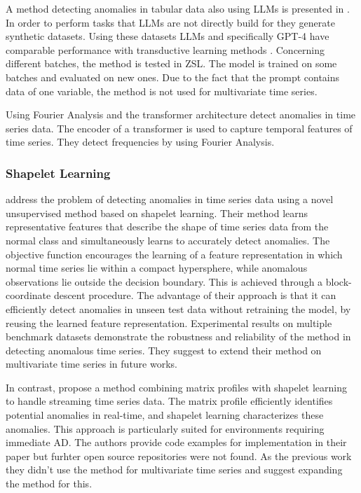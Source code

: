 A method detecting anomalies in tabular data also using LLMs is presented in \cite{li_anomaly_2024}. In order to perform tasks that LLMs are not directly build for they generate synthetic datasets. Using these datasets LLMs and specifically GPT-4 have comparable performance with transductive learning methods \cite[p. 6]{li_anomaly_2024}. Concerning different batches, the method is tested in ZSL. The model is trained on some batches and evaluated on new ones. Due to the fact that the prompt contains data of one variable, the method is not used for multivariate time series.

Using Fourier Analysis and the transformer architecture \cite{ye_multivariate_2023} detect anomalies in time series data. The encoder of a transformer is used to capture temporal features of time series. They detect frequencies by using Fourier Analysis.

\subsubsection{Shapelet Learning}
\cite{beggel_time_2019} address the problem of detecting anomalies in time series data using a novel unsupervised method based on shapelet learning. Their method learns representative features that describe the shape of time series data from the normal class and simultaneously learns to accurately detect anomalies. The objective function encourages the learning of a feature representation in which normal time series lie within a compact hypersphere, while anomalous observations lie outside the decision boundary. This is achieved through a block-coordinate descent procedure.
The advantage of their approach is that it can efficiently detect anomalies in unseen test data without retraining the model, by reusing the learned feature representation. Experimental results on multiple benchmark datasets demonstrate the robustness and reliability of the method in detecting anomalous time series. They suggest to extend their method on multivariate time series in future works.

In contrast, \cite{alshaer_detecting_2020} propose a method combining matrix profiles with shapelet learning to handle streaming time series data. The matrix profile efficiently identifies potential anomalies in real-time, and shapelet learning characterizes these anomalies. This approach is particularly suited for environments requiring immediate AD. The authors provide code examples for implementation in their paper but furhter open source repositories were not found. As the previous work they didn't use the method for multivariate time series and suggest expanding the method for this.

